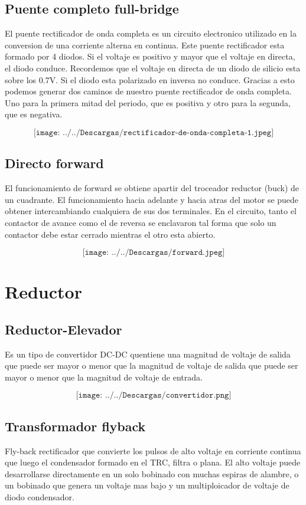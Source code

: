 \documentclass[12pt,a4paper]{report}
\begin{document}
\subsection{Puente completo full-bridge}

El puente rectificador de onda completa es un circuito electronico utilizado en la conversion de una corriente alterna en continua. Este puente rectificador esta formado por 4 diodos.
Si el voltaje es positivo y mayor que el voltaje en directa, el diodo conduce. Recordemos que el voltaje en directa de un diodo de silicio esta sobre los 0.7V. Si el diodo esta polarizado en inversa no conduce. Gracias a esto podemos generar dos caminos de nuestro puente rectificador de onda completa. Uno para la primera mitad del periodo, que es positiva y otro para la segunda, que es negativa.

$$\texttt{[image: ../../Descargas/rectificador-de-onda-completa-1.jpeg]} $$

\subsection{Directo forward}
El funcionamiento de forward se obtiene apartir del troceador reductor (buck) de un cuadrante.
El funcionamiento hacia adelante y hacia atras del motor se puede obtener intercambiando cualquiera de sus dos terminales.
En el circuito, tanto el contactor de avance como el de reversa se enclavaron tal forma que solo un contactor debe estar cerrado mientras el otro esta abierto.

$$\texttt{[image: ../../Descargas/forward.jpeg]} $$

\section{Reductor}

\subsection{Reductor-Elevador}
Es un tipo de convertidor DC-DC quentiene una magnitud de voltaje de salida que puede ser mayor o menor que la magnitud de voltaje de salida que puede ser mayor o menor que la magnitud de voltaje de entrada.

$$\texttt{[image: ../../Descargas/convertidor.png]} $$

\subsection{Transformador flyback}
Fly-back rectificador que convierte los pulsos de alto voltaje en corriente continua que luego el condensador formado en el TRC, filtra o plana. El alto voltaje puede desarrollarse directamente en un solo bobinado con muchas espiras de alambre, o un bobinado que genera un voltaje mas bajo y un multiploicador de voltaje de diodo condensador.
\end{document}
